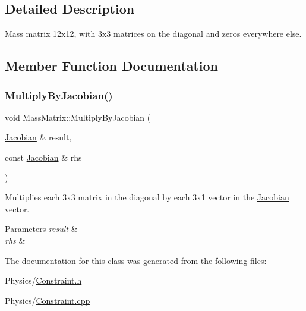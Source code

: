 \subsection{Detailed Description}
Mass matrix 12x12, with 3x3 matrices on the diagonal and zeros everywhere else. 

\subsection{Member Function Documentation}
\mbox{\label{classMassMatrix_a2e5a4cd3710baa07395e07b03c2cd49c}} 
\subsubsection{\texorpdfstring{Multiply\+By\+Jacobian()}{MultiplyByJacobian()}}
{\footnotesize\ttfamily void Mass\+Matrix\+::\+Multiply\+By\+Jacobian (\begin{DoxyParamCaption}\item[{\hyperlink{classJacobian}{Jacobian} \&}]{result,  }\item[{const \hyperlink{classJacobian}{Jacobian} \&}]{rhs }\end{DoxyParamCaption})}



Multiplies each 3x3 matrix in the diagonal by each 3x1 vector in the \hyperlink{classJacobian}{Jacobian} vector. 


\begin{DoxyParams}{Parameters}
{\em result} & \\
\hline
{\em rhs} & \\
\hline
\end{DoxyParams}


The documentation for this class was generated from the following files\+:\begin{DoxyCompactItemize}
\item 
Physics/\hyperlink{Constraint_8h}{Constraint.\+h}\item 
Physics/\hyperlink{Constraint_8cpp}{Constraint.\+cpp}\end{DoxyCompactItemize}
